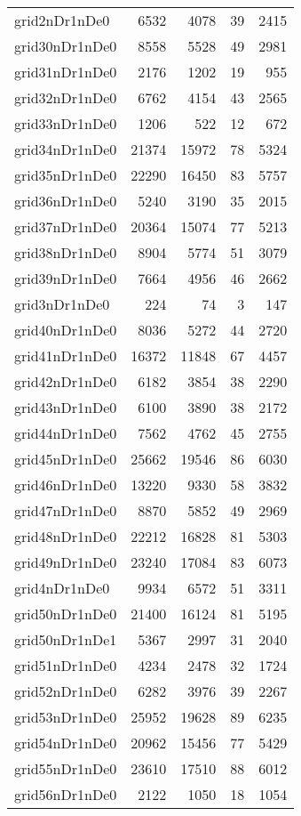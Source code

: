 \begin{longtable}{lrrrr}
grid2nDr1nDe0 & 6532 & 4078 & 39 & 2415 \\
grid30nDr1nDe0 & 8558 & 5528 & 49 & 2981 \\
grid31nDr1nDe0 & 2176 & 1202 & 19 & 955 \\
grid32nDr1nDe0 & 6762 & 4154 & 43 & 2565 \\
grid33nDr1nDe0 & 1206 & 522 & 12 & 672 \\
grid34nDr1nDe0 & 21374 & 15972 & 78 & 5324 \\
grid35nDr1nDe0 & 22290 & 16450 & 83 & 5757 \\
grid36nDr1nDe0 & 5240 & 3190 & 35 & 2015 \\
grid37nDr1nDe0 & 20364 & 15074 & 77 & 5213 \\
grid38nDr1nDe0 & 8904 & 5774 & 51 & 3079 \\
grid39nDr1nDe0 & 7664 & 4956 & 46 & 2662 \\
grid3nDr1nDe0 & 224 & 74 & 3 & 147 \\
grid40nDr1nDe0 & 8036 & 5272 & 44 & 2720 \\
grid41nDr1nDe0 & 16372 & 11848 & 67 & 4457 \\
grid42nDr1nDe0 & 6182 & 3854 & 38 & 2290 \\
grid43nDr1nDe0 & 6100 & 3890 & 38 & 2172 \\
grid44nDr1nDe0 & 7562 & 4762 & 45 & 2755 \\
grid45nDr1nDe0 & 25662 & 19546 & 86 & 6030 \\
grid46nDr1nDe0 & 13220 & 9330 & 58 & 3832 \\
grid47nDr1nDe0 & 8870 & 5852 & 49 & 2969 \\
grid48nDr1nDe0 & 22212 & 16828 & 81 & 5303 \\
grid49nDr1nDe0 & 23240 & 17084 & 83 & 6073 \\
grid4nDr1nDe0 & 9934 & 6572 & 51 & 3311 \\
grid50nDr1nDe0 & 21400 & 16124 & 81 & 5195 \\
grid50nDr1nDe1 & 5367 & 2997 & 31 & 2040 \\
grid51nDr1nDe0 & 4234 & 2478 & 32 & 1724 \\
grid52nDr1nDe0 & 6282 & 3976 & 39 & 2267 \\
grid53nDr1nDe0 & 25952 & 19628 & 89 & 6235 \\
grid54nDr1nDe0 & 20962 & 15456 & 77 & 5429 \\
grid55nDr1nDe0 & 23610 & 17510 & 88 & 6012 \\
grid56nDr1nDe0 & 2122 & 1050 & 18 & 1054 \\

\end{longtable}
